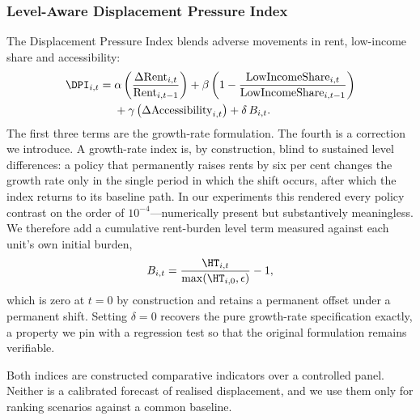 \subsubsection{Level-Aware Displacement Pressure Index}

The Displacement Pressure Index blends adverse movements in rent, low-income
share and accessibility:
\begin{align}
  \DPI_{i,t} =\;& \alpha \left( \frac{\Delta \mathrm{Rent}_{i,t}}
                                    {\mathrm{Rent}_{i,t-1}} \right)
  + \beta \left( 1 - \frac{\mathrm{LowIncomeShare}_{i,t}}
                          {\mathrm{LowIncomeShare}_{i,t-1}} \right) \nonumber\\
  &+ \gamma \left( \Delta \mathrm{Accessibility}_{i,t} \right)
   + \delta \, B_{i,t} .
  \label{eq:dpi}
\end{align}
The first three terms are the growth-rate formulation. The fourth is a
correction we introduce. A growth-rate index is, by construction, blind to
sustained level differences: a policy that permanently raises rents by six per
cent changes the growth rate only in the single period in which the shift
occurs, after which the index returns to its baseline path. In our experiments
this rendered every policy contrast on the order of $10^{-4}$---numerically
present but substantively meaningless. We therefore add a cumulative
rent-burden level term measured against each unit's own initial burden,
\begin{equation}
  B_{i,t} = \frac{\HT_{i,t}}{\max(\HT_{i,0}, \epsilon)} - 1 ,
  \label{eq:burden}
\end{equation}
which is zero at $t = 0$ by construction and retains a permanent offset under a
permanent shift. Setting $\delta = 0$ recovers the pure growth-rate
specification exactly, a property we pin with a regression test so that the
original formulation remains verifiable.

Both indices are constructed comparative indicators over a controlled panel.
Neither is a calibrated forecast of realised displacement, and we use them only
for ranking scenarios against a common baseline.
